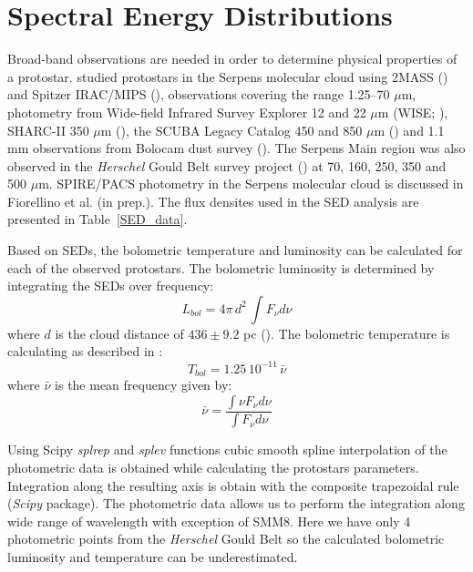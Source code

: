 \documentclass{aa}
\begin{document}
%
%
\begin{appendix} %
\label{app:seds}
\section{Spectral Energy Distributions}


Broad-band observations are needed in order to determine physical properties of a protostar. \cite{Dun15} studied protostars in the Serpens molecular cloud using 2MASS
(\citealt{Skr06}) and Spitzer IRAC/MIPS (\citealt{Eva09}), observations covering the range
1.25–70 $\mu$m, photometry from Wide-field Infrared Survey Explorer 12 and 22 $\mu$m (WISE;
\citealt{Wri10}), SHARC-II 350 $\mu$m (\citealt{Sur16}), the SCUBA Legacy Catalog 450 and 850 $\mu$m
(\citealt{dFr08}) and 1.1 mm observations from Bolocam dust survey (\citealt{Eno07}). The Serpens
Main region was also observed in the \textit{Herschel} Gould Belt survey project (\citealt{And10}) at 70, 160, 250, 350 and 500 $\mu$m.
SPIRE/PACS photometry in the Serpens molecular cloud is discussed in Fiorellino et al. (in prep.). The flux densites used in the SED analysis are presented in Table~\ref{SED_data}.

Based on SEDs, the bolometric temperature and luminosity can be calculated for each of the observed
protostars. The bolometric luminosity is determined by integrating the SEDs over frequency:
\begin{equation} \label{eq6} L_{bol} = 4 \pi \, d^2 \, \int F_\nu d\nu \end{equation} where $d$ is the
cloud distance of $436 \pm 9.2$ pc (\citealt{Ort17}). The bolometric temperature is calculating as
described in \cite{Mye93}: \begin{equation} \label{eq7} T_{bol} = 1.25 \, 10^{-11} \, \bar{\nu}
\end{equation} where $\bar{\nu}$ is the mean frequency given by: \begin{equation} \label{eq8}
\bar{\nu} = \frac{\int \nu F_\nu d\nu}{ \int F_\nu d\nu} \end{equation}

Using Scipy \textit{splrep} and \textit{splev} functions cubic smooth spline interpolation of the
photometric data is obtained while calculating the protostars parameters. Integration along the
resulting axis is obtain with the composite trapezoidal rule (\textit{Scipy} package). The
photometric data allows us to perform the integration along wide range of wavelength with exception
of SMM8. Here we have only 4 photometric points from the \textit{Herschel} Gould Belt so the calculated
bolometric luminosity and temperature can be underestimated.


\end{appendix}
\end{document}
